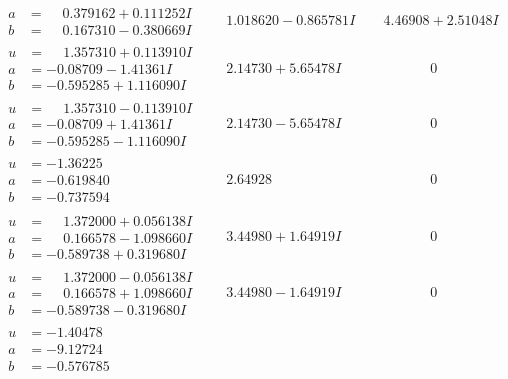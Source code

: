 \documentclass[1p]{elsarticle_modified}
\theoremstyle{definition}
\begin{document}
$$\begin{array}{c|c|c}
\begin{aligned}
a &= \phantom{-}0.379162 + 0.111252 I \\
b &= \phantom{-}0.167310 - 0.380669 I\end{aligned}
 & \phantom{-}1.018620 - 0.865781 I & \phantom{-}4.46908 + 2.51048 I \\ \hline\begin{aligned}
u &= \phantom{-}1.357310 + 0.113910 I \\
a &= -0.08709 - 1.41361 I \\
b &= -0.595285 + 1.116090 I\end{aligned}
 & \phantom{-}2.14730 + 5.65478 I & \phantom{-0.000000 } 0 \\ \hline\begin{aligned}
u &= \phantom{-}1.357310 - 0.113910 I \\
a &= -0.08709 + 1.41361 I \\
b &= -0.595285 - 1.116090 I\end{aligned}
 & \phantom{-}2.14730 - 5.65478 I & \phantom{-0.000000 } 0 \\ \hline\begin{aligned}
u &= -1.36225\phantom{ +0.000000I} \\
a &= -0.619840\phantom{ +0.000000I} \\
b &= -0.737594\phantom{ +0.000000I}\end{aligned}
 & \phantom{-}2.64928\phantom{ +0.000000I} & \phantom{-0.000000 } 0 \\ \hline\begin{aligned}
u &= \phantom{-}1.372000 + 0.056138 I \\
a &= \phantom{-}0.166578 - 1.098660 I \\
b &= -0.589738 + 0.319680 I\end{aligned}
 & \phantom{-}3.44980 + 1.64919 I & \phantom{-0.000000 } 0 \\ \hline\begin{aligned}
u &= \phantom{-}1.372000 - 0.056138 I \\
a &= \phantom{-}0.166578 + 1.098660 I \\
b &= -0.589738 - 0.319680 I\end{aligned}
 & \phantom{-}3.44980 - 1.64919 I & \phantom{-0.000000 } 0 \\ \hline\begin{aligned}
u &= -1.40478\phantom{ +0.000000I} \\
a &= -9.12724\phantom{ +0.000000I} \\
b &= -0.576785\phantom{ +0.000000I}\end{aligned}

\end{array}$$
\end{document}
